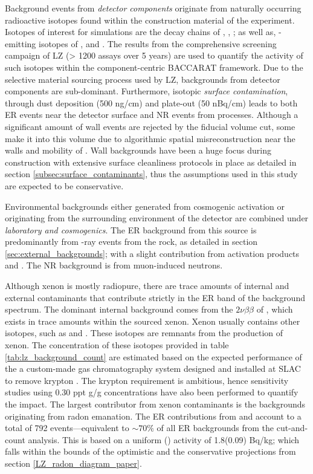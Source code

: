 Background events from \textit{detector components} originate from naturally occurring radioactive isotopes found within the construction material of the experiment. Isotopes of interest for simulations are the decay chains of \UTTE{}, \UTTF{}, \ThTTT{}; as well as, \gamma-emitting isotopes of \KFZ{}, \CsOTS{} and \CoSZ{}. The results from the comprehensive screening campaign of LZ (> 1200 assays over 5 years) are used to quantify the activity of such isotopes within the component-centric BACCARAT framework. Due to the selective material sourcing process used by LZ, backgrounds from detector components are sub-dominant. Furthermore, isotopic \textit{surface contamination}, through dust deposition (500 ng/cm\squared{}) and \RnTTT{} plate-out (50 nBq/cm\squared) leads to both ER events near the detector surface and NR events from \alphaN{} processes. Although a significant amount of wall events are rejected by the fiducial volume cut, some make it into this volume due to algorithmic spatial misreconstruction near the walls and mobility of \BiTOZ{}. Wall backgrounds have been a huge focus during construction with extensive surface cleanliness protocols in place as detailed in section \ref{subsec:surface_contaminants}, thus the assumptions used in this study are expected to be conservative.

%

%

Environmental backgrounds either generated from cosmogenic activation or originating from the surrounding environment of the detector are combined under \textit{laboratory and cosmogenics}. The ER background from this source is predominantly from \gamma-ray events from the rock, as detailed in section \ref{sec:external_backgrounds}; with a slight contribution from activation products \XeOTS{} and \ScFS{}. The NR background is from muon-induced neutrons. 

Although xenon is mostly radiopure, there are trace amounts of internal and external contaminants that contribute strictly in the ER band of the background spectrum. The dominant internal background comes from the $2\nu\beta\beta$ of \XeOTS{}, which exists in trace amounts within the sourced xenon. Xenon usually contains other isotopes, such as \KrEF{} and \ArTN{}. These isotopes are remnants from the production of xenon. The concentration of these isotopes provided in table \ref{tab:lz_background_count} are estimated based on the expected performance of the a custom-made gas chromatography system designed and installed at SLAC to remove krypton \cite{lz_tdr}. The krypton requirement is ambitious, hence sensitivity studies using 0.30 ppt g/g concentrations have also been performed to quantify the impact. The largest contributor from xenon contaminants is the backgrounds originating from radon emanation. The ER contributions from \RnTTT{} and \RnTTZ{} account to a total of 792 events---equivalent to $\sim70\%$ of all ER backgrounds from the cut-and-count analysis. This is based on a uniform \RnTTT{}(\RnTTZ{}) activity of 1.8(0.09) \micro{}Bq/kg; which falls within the bounds of the optimistic and the conservative projections from section \ref{LZ_radon_diagram_paper}.

